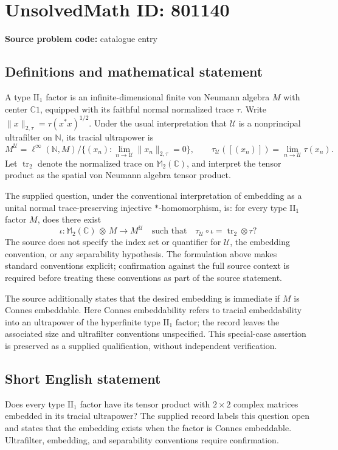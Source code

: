 \documentclass[11pt]{article}
\newcommand{\N}{\mathbb{N}}
\newcommand{\C}{\mathbb{C}}
\begin{document}
\section*{UnsolvedMath ID: 801140}
\textbf{Source problem code:} catalogue entry
\subsection{Definitions and mathematical statement}
A type \(\mathrm{II}_1\) factor is an infinite-dimensional finite von Neumann algebra \(M\) with center \(\C 1\), equipped with its faithful normal normalized trace \(\tau\). Write \(\|x\|_{2,\tau}=\tau(x^*x)^{1/2}\). Under the usual interpretation that \(\mathcal U\) is a nonprincipal ultrafilter on \(\N\), its tracial ultrapower is
\[
M^{\mathcal U}=\ell^\infty(\N,M)\big/\{(x_n):\lim_{n\to\mathcal U}\|x_n\|_{2,\tau}=0\},
\qquad
\tau_{\mathcal U}([(x_n)])=\lim_{n\to\mathcal U}\tau(x_n).
\]
Let \(\operatorname{tr}_2\) denote the normalized trace on \(\mathbb M_2(\C)\), and interpret the tensor product as the spatial von Neumann algebra tensor product.

The supplied question, under the conventional interpretation of embedding as a unital normal trace-preserving injective \(*\)-homomorphism, is: for every type \(\mathrm{II}_1\) factor \(M\), does there exist
\[
\iota:\mathbb M_2(\C)\,\overline\otimes\,M\longrightarrow M^{\mathcal U}
\quad\text{such that}\quad
\tau_{\mathcal U}\circ\iota=\operatorname{tr}_2\otimes\tau?
\]
The source does not specify the index set or quantifier for \(\mathcal U\), the embedding convention, or any separability hypothesis. The formulation above makes standard conventions explicit; confirmation against the full source context is required before treating these conventions as part of the source statement.

The source additionally states that the desired embedding is immediate if \(M\) is Connes embeddable. Here Connes embeddability refers to tracial embeddability into an ultrapower of the hyperfinite type \(\mathrm{II}_1\) factor; the record leaves the associated size and ultrafilter conventions unspecified. This special-case assertion is preserved as a supplied qualification, without independent verification.
\subsection{Short English statement}
Does every type \(\mathrm{II}_1\) factor have its tensor product with \(2\times2\) complex matrices embedded in its tracial ultrapower? The supplied record labels this question open and states that the embedding exists when the factor is Connes embeddable. Ultrafilter, embedding, and separability conventions require confirmation.
\end{document}
